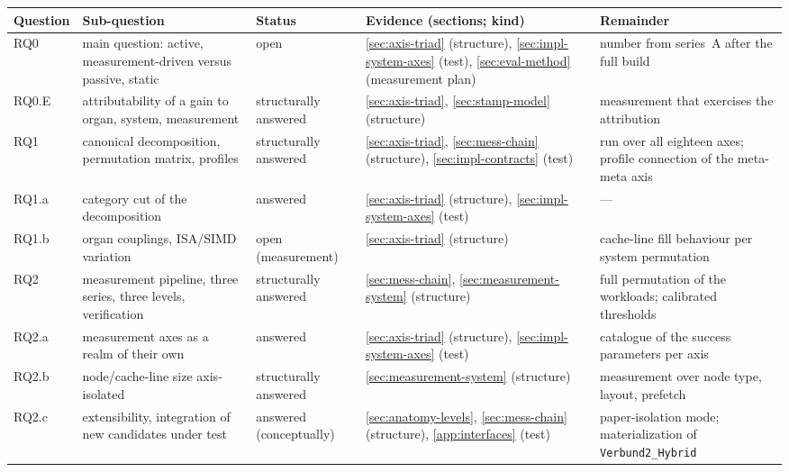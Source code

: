 \begin{table}[htbp]\centering\footnotesize
\begin{tabular}{@{}>{\raggedright\arraybackslash}p{1.3cm}>{\raggedright\arraybackslash}p{3.0cm}>{\raggedright\arraybackslash}p{2.0cm}>{\raggedright\arraybackslash}p{4.4cm}>{\raggedright\arraybackslash}p{3.3cm}@{}}
\toprule
Question & Sub-question & Status & Evidence (sections; kind) & Remainder \\
\midrule
RQ0 & main question: active, measurement-driven versus passive, static & open & {\ref{sec:axis-triad}} (structure), {\ref{sec:impl-system-axes}} (test), {\ref{sec:eval-method}} (measurement plan) & number from series~A after the full build \\
RQ0.E & attributability of a gain to organ, system, measurement & structurally answered & {\ref{sec:axis-triad}}, {\ref{sec:stamp-model}} (structure) & measurement that exercises the attribution \\
RQ1 & canonical decomposition, permutation matrix, profiles & structurally answered & {\ref{sec:axis-triad}}, {\ref{sec:mess-chain}} (structure), {\ref{sec:impl-contracts}} (test) & run over all eighteen axes; profile connection of the meta-meta axis \\
RQ1.a & category cut of the decomposition & answered & {\ref{sec:axis-triad}} (structure), {\ref{sec:impl-system-axes}} (test) & --- \\
RQ1.b & organ couplings, ISA/SIMD variation & open (measurement) & {\ref{sec:axis-triad}} (structure) & cache-line fill behaviour per system permutation \\
RQ2 & measurement pipeline, three series, three levels, verification & structurally answered & {\ref{sec:mess-chain}}, {\ref{sec:measurement-system}} (structure) & full permutation of the workloads; calibrated thresholds \\
RQ2.a & measurement axes as a realm of their own & answered & {\ref{sec:axis-triad}} (structure), {\ref{sec:impl-system-axes}} (test) & catalogue of the success parameters per axis \\
RQ2.b & node/cache-line size axis-isolated & structurally answered & {\ref{sec:measurement-system}} (structure) & measurement over node type, layout, prefetch \\
RQ2.c & extensibility, integration of new candidates under test & answered (conceptually) & {\ref{sec:anatomy-levels}}, {\ref{sec:mess-chain}} (structure), {\ref{app:interfaces}} (test) & paper-isolation mode; materialization of \texttt{Verbund2\_Hybrid} \\

\end{tabular}
\end{table}
